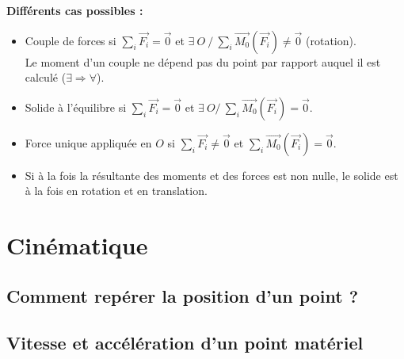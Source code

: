 \documentclass[13pt, twoside, a4paper, french]{report}
\begin{document}
        \textbf{Différents cas possibles :}
        \begin{itemize}
            \item Couple de forces si $\sum_i \overrightarrow{F_i} = \vec 0$ et $\exists\ O\ /\ \sum_i \overrightarrow{M_0}(\overrightarrow{F_i}) \neq \vec 0$ (rotation).\\Le moment d’un couple ne dépend pas du point par rapport auquel il est calculé ($\exists \Rightarrow \forall$).
            \item Solide à l'équilibre si $\sum_i \overrightarrow{F_i} = \vec 0$ et $\exists\ O /\ \sum_i \overrightarrow{M_0}(\overrightarrow{F_i}) = \vec 0$.
            \item Force unique appliquée en $O$ si $\sum_i \overrightarrow{F_i} \neq \vec 0$ et $\sum_i \overrightarrow{M_0}(\overrightarrow{F_i}) = \vec 0$.
            \item Si à la fois la résultante des moments et des forces est non nulle, le solide est à la fois en rotation et en translation.
        \end{itemize}


\chapter{Cinématique}\label{ch:cinematique}
    
    
    \section{Comment repérer la position d’un point ?}\label{sec:comment-reperer-la-position-dun-point-?}
        
    
    
    \section{Vitesse et accélération d’un point matériel}\label{sec:vitesse-et-acceleration-dun-point-materiel}
        
\end{document}
